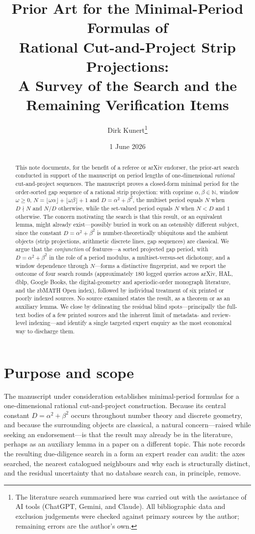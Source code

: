 \documentclass[11pt]{article}
\title{Prior Art for the Minimal-Period Formulas of\\
Rational Cut-and-Project Strip Projections:\\[2pt]
\large A Survey of the Search and the Remaining Verification Items}
\author{Dirk Kunert\thanks{The literature search summarised here was carried out
with the assistance of AI tools (ChatGPT, Gemini, and Claude). All bibliographic
data and exclusion judgements were checked against primary sources by the author;
remaining errors are the author's own.}}
\date{1 June 2026}
\theoremstyle{plain}
\theoremstyle{remark}
\newcommand{\N}{\mathbb{N}}
\begin{document}
\maketitle

\begin{abstract}
This note documents, for the benefit of a referee or arXiv endorser, the prior-art
search conducted in support of the manuscript on period lengths of one-dimensional
\emph{rational} cut-and-project sequences. The manuscript proves a closed-form
minimal period for the order-sorted gap sequence of a rational strip projection:
with coprime $\alpha,\beta\in\N$, window $\omega\ge 0$,
$N=\lfloor\omega\alpha\rfloor+\lfloor\omega\beta\rfloor+1$ and
$D=\alpha^2+\beta^2$, the multiset period equals $N$ when $D\nmid N$ and $N/D$
otherwise, while the set-valued period equals $N$ when $N<D$ and $1$ otherwise.
The concern motivating the search is that this result, or an equivalent lemma,
might already exist---possibly buried in work on an ostensibly different subject,
since the constant $D=\alpha^2+\beta^2$ is number-theoretically ubiquitous and the
ambient objects (strip projections, arithmetic discrete lines, gap sequences) are
classical. We argue that the \emph{conjunction} of features---a sorted projected
gap period, with $D=\alpha^2+\beta^2$ in the role of a period modulus, a
multiset-versus-set dichotomy, and a window dependence through $N$---forms a
distinctive fingerprint, and we report the outcome of four search rounds
(approximately $180$ logged queries across arXiv, HAL, dblp, Google Books, the
digital-geometry and aperiodic-order monograph literature, and the zbMATH Open
index), followed by individual treatment of six printed or poorly indexed sources.
No source examined states the result, as a theorem or as an auxiliary lemma. We
close by delineating the residual blind spots---principally the full-text bodies of
a few printed sources and the inherent limit of metadata- and review-level
indexing---and identify a single targeted expert enquiry as the most economical way
to discharge them.
\end{abstract}

\section{Purpose and scope}\label{sec:purpose}

The manuscript under consideration establishes minimal-period formulas for a
one-dimensional rational cut-and-project construction. Because its central constant
$D=\alpha^2+\beta^2$ occurs throughout number theory and discrete geometry, and
because the surrounding objects are classical, a natural concern---raised while
seeking an endorsement---is that the result may already be in the literature,
perhaps as an auxiliary lemma in a paper on a different topic. This note records the
resulting due-diligence search in a form an expert reader can audit: the axes
searched, the nearest catalogued neighbours and why each is structurally distinct,
and the residual uncertainty that no database search can, in principle, remove.
\end{document}
